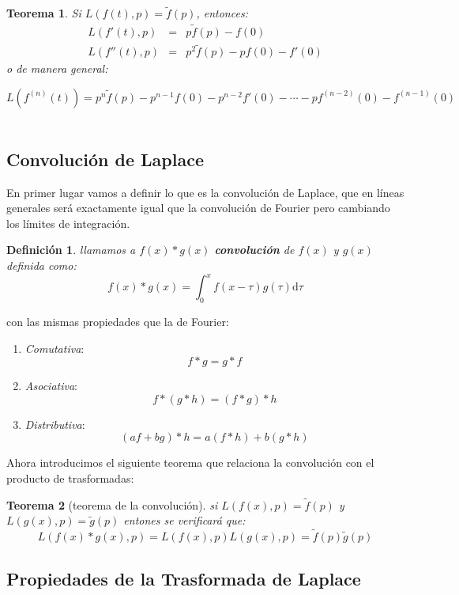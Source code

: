 \documentclass[12pt,a4paper]{book}
\newcommand{\D}{\mathrm{d}}
\newtheorem{theorem}{Teorema}[section]
\newtheorem{definicion}{Definición}[section]
\begin{document}
\begin{theorem}
Si $L(f(t),p) = \tilde{f}(p)$, entonces:
$$ \begin{array}{rll}  L(f'(t),p) & =  & p \tilde{f}(p)  - f(0) \\
L(f''(t),p) & = & p^2 \tilde{f}(p)-pf(0)-f'(0) \end{array} $$
o de manera general:

$$ L(f^{(n)} (t)) = p^n \tilde{f}(p) - p^{n-1} f(0) - p^{n-2} f'(0)- \cdots - pf^{(n-2)}(0) - f^{(n-1)}(0) $$\\
\end{theorem}


\subsection{Convolución de Laplace}

En primer lugar vamos a definir lo que es la convolución de Laplace, que en líneas generales será exactamente igual que la convolución de Fourier pero cambiando los límites de integración. 

\begin{definicion}
llamamos a $f(x)*g(x)$ \textbf{convolución} de $f(x)$ y $g(x)$ definida como:
$$ f(x)*g(x) = \int_0^x f(x- \tau) g(\tau) \D \tau $$
\end{definicion}

con las mismas propiedades que la de Fourier:

\begin{enumerate}
\item \textit{Comutativa}: $$ f * g = g * f $$
\item \textit{Asociativa}: $$ f * (g * h) = (f * g) * h $$
\item \textit{Distributiva}: $$ (a f + b g) * h = a (f * h) + b (g * h) $$
\end{enumerate}


Ahora introducimos el siguiente teorema que relaciona la convolución con el producto de trasformadas:

\begin{theorem}[teorema de la convolución]
si $L(f(x),p) = \tilde{f}(p)$ y $L(g(x),p) = \tilde{g}(p)$ entones se verificará que:
$$ L(f(x) * g(x),p) = L(f(x),p) L(g(x),p) = \tilde{f}(p) \tilde{g}(p) $$
\end{theorem}

\subsection{Propiedades de la Trasformada de Laplace}
\end{document}
